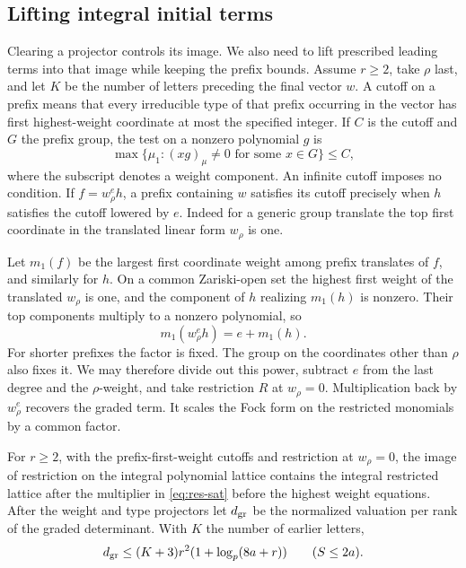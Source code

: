 \subsection{Lifting integral initial terms}

Clearing a projector controls its image. We also need to lift prescribed leading terms into that image while keeping the prefix bounds.
Assume \(r\ge2\), take \(\rho\) last, and let \(K\) be the number
of letters preceding the final vector \(w\). A cutoff on a prefix
means that every irreducible type of that prefix occurring in
the vector has first highest-weight coordinate at most the specified
integer. If \(C\) is the cutoff and \(G\) the prefix group, the test on a nonzero polynomial \(g\) is
\[
 \max\{\mu_1:(xg)_\mu\ne0\text{ for some }x\in G\}\le C,
\]
where the subscript denotes a weight component. An infinite cutoff imposes
no condition. If \(f=w_\rho^e h\), a prefix containing \(w\)
satisfies its cutoff precisely when \(h\) satisfies the cutoff
lowered by \(e\). Indeed for a generic group translate the top
first coordinate in the translated linear form \(w_\rho\) is one.

Let \(m_1(f)\) be the largest first coordinate weight among
prefix translates of \(f\), and similarly for \(h\). On a common
Zariski-open set the highest first weight of the translated
\(w_\rho\) is one, and the component of \(h\) realizing \(m_1(h)\)
is nonzero. Their top components multiply to a nonzero polynomial,
so
\[
                  m_1(w_\rho^e h)=e+m_1(h).
\] For shorter prefixes the
factor is fixed. The group on the coordinates other than \(\rho\)
also fixes it. We may therefore divide out this power, subtract
\(e\) from the last degree and the \(\rho\)-weight, and take
restriction \(R\) at \(w_\rho=0\). Multiplication back by
\(w_\rho^e\) recovers the graded term. It scales the Fock
form on the restricted monomials by a common factor.

\begin{lemma}
\label{lem:graded-coefficient-lift}
For \(r\ge2\), with the prefix-first-weight cutoffs and
restriction at \(w_\rho=0\), the image of restriction
on the integral polynomial lattice contains the integral restricted
lattice after the multiplier in \eqref{eq:res-sat} before the highest
weight equations. After the weight and type projectors let \(d_{\rm gr}\) be the normalized valuation per rank of the graded determinant. With \(K\) the number of earlier letters,
\[
 d_{\rm gr}\le(K+3)r^2(1+\log_p(8a+r))\qquad(S\le2a).
\]

\end{lemma}

